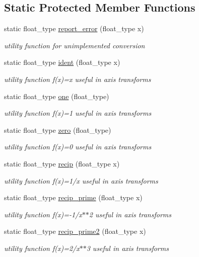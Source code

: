 \subsection*{Static Protected Member Functions}
\begin{DoxyCompactItemize}
\item 
static float\+\_\+type \hyperlink{classc2__transformation_a79f51b6fefc32d826735daf184f76613}{report\+\_\+error} (float\+\_\+type x)
\begin{DoxyCompactList}\small\item\em utility function for unimplemented conversion \end{DoxyCompactList}\item 
static float\+\_\+type \hyperlink{classc2__transformation_a2dfa80bc8a5f4103b8093890627c194b}{ident} (float\+\_\+type x)
\begin{DoxyCompactList}\small\item\em utility function f(x)=x useful in axis transforms \end{DoxyCompactList}\item 
static float\+\_\+type \hyperlink{classc2__transformation_ad29b2f8bff1298a915fead61babfbf69}{one} (float\+\_\+type)
\begin{DoxyCompactList}\small\item\em utility function f(x)=1 useful in axis transforms \end{DoxyCompactList}\item 
static float\+\_\+type \hyperlink{classc2__transformation_a81a65d1c58abae1f7bed846f736a9887}{zero} (float\+\_\+type)
\begin{DoxyCompactList}\small\item\em utility function f(x)=0 useful in axis transforms \end{DoxyCompactList}\item 
static float\+\_\+type \hyperlink{classc2__transformation_a201c2df7a29fc20946f3814816d88bbc}{recip} (float\+\_\+type x)
\begin{DoxyCompactList}\small\item\em utility function f(x)=1/x useful in axis transforms \end{DoxyCompactList}\item 
static float\+\_\+type \hyperlink{classc2__transformation_aac46f68fd9037c3f65b9578e0d7000fe}{recip\+\_\+prime} (float\+\_\+type x)
\begin{DoxyCompactList}\small\item\em utility function f(x)=-\/1/x$\ast$$\ast$2 useful in axis transforms \end{DoxyCompactList}\item 
static float\+\_\+type \hyperlink{classc2__transformation_a58e93b52b477a022e7b74c5e1056d3d7}{recip\+\_\+prime2} (float\+\_\+type x)
\begin{DoxyCompactList}\small\item\em utility function f(x)=2/x$\ast$$\ast$3 useful in axis transforms \end{DoxyCompactList}\end{DoxyCompactItemize}


